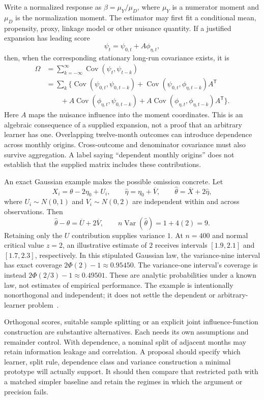 Write a normalized response as $\beta=\mu_Y/\mu_D$, where $\mu_Y$ is a
numerator moment and $\mu_D$ is the normalization moment. The estimator may
first fit a conditional mean, propensity, proxy, linkage model or other
nuisance quantity. If a justified expansion has leading score
\[
 \psi_t=\psi_{0,t}+A\phi_{\eta,t},
\]
then, when the corresponding stationary long-run covariance exists, it is
\begin{align*}
 \Omega
 &=\sum_{k=-\infty}^{\infty}
   \operatorname{Cov}(\psi_t,\psi_{t-k})\\
 &=\sum_k\bigl\{
   \operatorname{Cov}(\psi_{0,t},\psi_{0,t-k})
   +\operatorname{Cov}(\psi_{0,t},\phi_{\eta,t-k})A^{\mathsf T}
   \\
 &\qquad+A\operatorname{Cov}(\phi_{\eta,t},\psi_{0,t-k})
   +A\operatorname{Cov}(\phi_{\eta,t},\phi_{\eta,t-k})A^{\mathsf T}
   \bigr\}.
\end{align*}
Here $A$ maps the nuisance influence into the moment coordinates. This is an
algebraic consequence of a supplied expansion, not a proof that an arbitrary
learner has one. Overlapping twelve-month outcomes can introduce dependence
across monthly origins. Cross-outcome and denominator covariance must also
survive aggregation. A label saying ``dependent monthly origins'' does not
establish that the supplied matrix includes these contributions.

An exact Gaussian example makes the possible omission concrete. Let
\[
 X_i=\theta-2\eta_0+U_i,\qquad
 \widehat\eta=\eta_0+\overline V,\qquad
 \widehat\theta=\overline X+2\widehat\eta,
\]
where $U_i\sim N(0,1)$ and $V_i\sim N(0,2)$ are independent within and
across observations. Then
\[
 \widehat\theta-\theta=\overline U+2\overline V,
 \qquad n\operatorname{Var}(\widehat\theta)=1+4(2)=9.
\]
Retaining only the $U$ contribution supplies variance $1$. At $n=400$ and
normal critical value $z=2$, an illustrative estimate of $2$ receives intervals
$[1.9,2.1]$ and $[1.7,2.3]$, respectively. In this stipulated Gaussian law,
the variance-nine interval has exact coverage $2\Phi(2)-1\approx0.95450$.
The variance-one interval's coverage is instead
$2\Phi(2/3)-1\approx0.49501$. These are analytic probabilities under a known
law, not estimates of empirical performance. The example is intentionally
nonorthogonal and independent; it does not settle the dependent or
arbitrary-learner problem~\citep{exec13_funding_exact}.

Orthogonal scores, suitable sample splitting or an explicit joint
influence-function construction are substantive alternatives. Each needs
its own assumptions and remainder control. With dependence, a nominal
split of adjacent months may retain information leakage and correlation.
A proposal should specify which learner, split rule, dependence class and
variance construction a minimal prototype will actually support. It should
then compare that restricted path with a matched simpler baseline and retain
the regimes in which the argument or precision fails.

